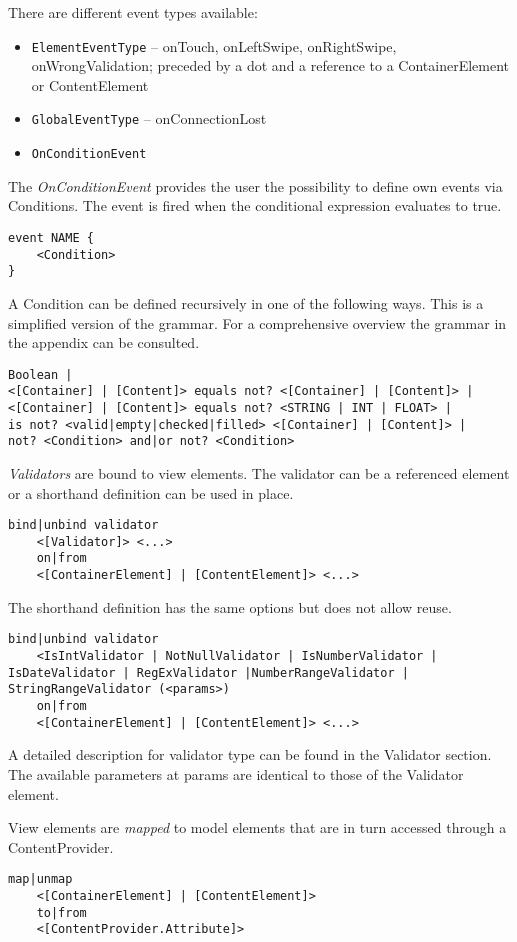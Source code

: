 There are different event types available:
\begin{itemize}
\item \lstinline!ElementEventType! -- onTouch, onLeftSwipe, onRightSwipe, onWrongValidation; preceded by a dot and a reference to a ContainerElement or ContentElement
\item \lstinline!GlobalEventType! -- onConnectionLost
\item \lstinline!OnConditionEvent!
\end{itemize}


The \textit{OnConditionEvent} provides the user the possibility to define own events via Conditions. The event is fired when the conditional expression evaluates to true.
\begin{lstlisting}
event NAME {
	<Condition>
}
\end{lstlisting}

A Condition can be defined recursively in one of the following ways. This is a simplified version of the grammar. For a comprehensive overview the grammar in the appendix can be consulted.
\begin{lstlisting}
Boolean |
<[Container] | [Content]> equals not? <[Container] | [Content]> |
<[Container] | [Content]> equals not? <STRING | INT | FLOAT> |
is not? <valid|empty|checked|filled> <[Container] | [Content]> |
not? <Condition> and|or not? <Condition>
\end{lstlisting}

\textit{Validators} are bound to view elements. The validator can be a referenced element or a shorthand definition can be used in place.
\begin{lstlisting}
bind|unbind validator
	<[Validator]> <...>
	on|from
	<[ContainerElement] | [ContentElement]> <...>
\end{lstlisting}

The shorthand definition has the same options but does not allow reuse.
\begin{lstlisting}
bind|unbind validator
	<IsIntValidator | NotNullValidator | IsNumberValidator | IsDateValidator | RegExValidator |NumberRangeValidator | StringRangeValidator (<params>)
	on|from
	<[ContainerElement] | [ContentElement]> <...>
\end{lstlisting}

A detailed description for validator type can be found in the Validator section. The available parameters at params are identical to those of the Validator element.

View elements are \textit{mapped} to model elements that are in turn accessed through a ContentProvider.
\begin{lstlisting}
map|unmap
	<[ContainerElement] | [ContentElement]>
	to|from
	<[ContentProvider.Attribute]>

\end{lstlisting}

